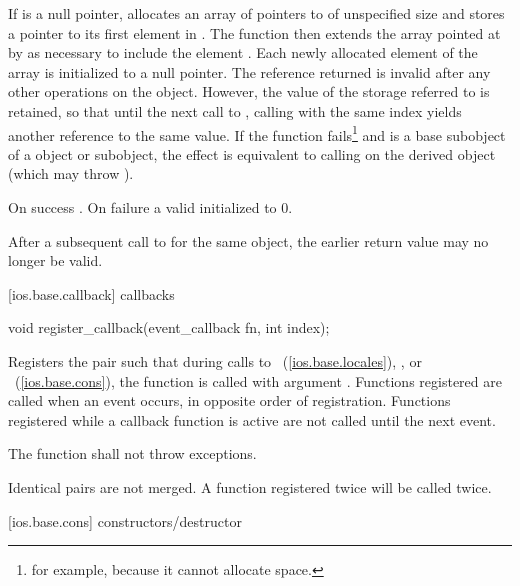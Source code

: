 \begin{itemdescr}
\pnum
\effects
If  is a null pointer, allocates an array of
pointers to  of unspecified size and stores a pointer to
its
first element in .
The function then extends the array
pointed at by  as necessary to include the element
.
Each newly allocated element of the array is initialized to a null
pointer.
The reference returned is invalid after any other operations on the
object.
However, the value of the storage referred to is retained, so
that until the next call to
,
calling
with the same index yields another reference to the same value.
If the function fails\footnote{for example, because it cannot allocate space.}
and
is a base subobject of a
object or subobject, the effect is equivalent to calling
on the derived object (which may throw
).

\pnum
\returns
On success
.
On failure a valid
initialized to 0.

\pnum
\remarks
After a subsequent call to
for the same object, the earlier return value may no longer be valid.
\end{itemdescr}

[ios.base.callback]{ callbacks}

%
\begin{itemdecl}
void register_callback(event_callback fn, int index);
\end{itemdecl}

\begin{itemdescr}
\pnum
\effects
Registers the pair
such that during calls to
~(\ref{ios.base.locales}),
,
or
~(\ref{ios.base.cons}),
the function
is called with argument
.
Functions registered are called when an event occurs, in opposite order of
registration.
Functions registered while a callback function is active are not called until the next event.

\pnum
\requires
The function
shall not throw exceptions.

\pnum
\remarks
Identical pairs are not merged.
A function registered twice will be called twice.
\end{itemdescr}

[ios.base.cons]{ constructors/destructor}

